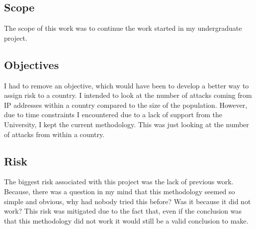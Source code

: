 \subsection{Scope}

The scope of this work was to continue the work started in my undergraduate project. 


\subsection{Objectives}

I had to remove an objective, which would have been to develop a better way to assign risk to a country. I intended to look at the number of attacks coming from IP addresses within a country compared to the size of the population. However, due to time constraints I encountered due to a lack of support from the University, I kept the current methodology. This was just looking at the number of attacks from within a country.

\subsection{Risk}

The biggest risk associated with this project was the lack of previous work. Because, there was a question in my mind that this methodology seemed so simple and obvious, why had nobody tried this before? Was it because it did not work? This risk was mitigated due to the fact that, even if the conclusion was that this methodology did not work it would still be a valid conclusion to make.